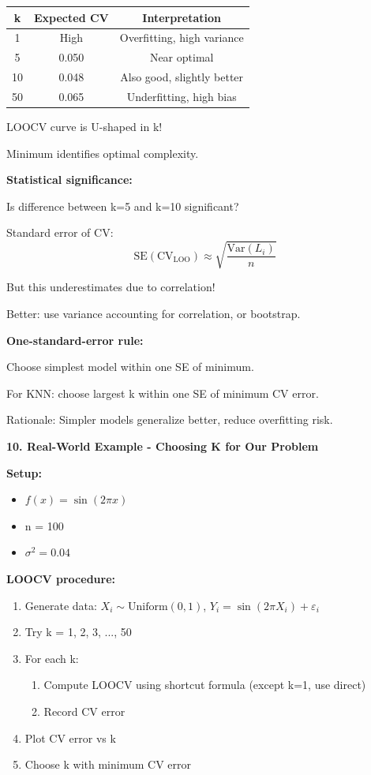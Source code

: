 \documentclass[12pt]{article}
\begin{document}
\begin{explanation}
\begin{center}
\begin{tabular}{c|c|c}
k & Expected CV & Interpretation \\
\hline
1 & High & Overfitting, high variance \\
5 & 0.050 & Near optimal \\
10 & 0.048 & Also good, slightly better \\
50 & 0.065 & Underfitting, high bias \\
\end{tabular}
\end{center}

LOOCV curve is U-shaped in k!

Minimum identifies optimal complexity.

\textbf{Statistical significance:}

Is difference between k=5 and k=10 significant?

Standard error of CV:
\[
\text{SE}(\text{CV}_{\text{LOO}}) \approx \sqrt{\frac{\text{Var}(L_i)}{n}}
\]

But this underestimates due to correlation!

Better: use variance accounting for correlation, or bootstrap.

\textbf{One-standard-error rule:}

Choose simplest model within one SE of minimum.

For KNN: choose largest k within one SE of minimum CV error.

Rationale: Simpler models generalize better, reduce overfitting risk.

\textbf{10. Real-World Example - Choosing K for Our Problem}

\textbf{Setup:}
\begin{itemize}
    \item $f(x) = \sin(2\pi x)$
    \item n = 100
    \item $\sigma^2 = 0.04$
\end{itemize}

\textbf{LOOCV procedure:}

\begin{enumerate}
    \item Generate data: $X_i \sim \text{Uniform}(0,1)$, $Y_i = \sin(2\pi X_i) + \varepsilon_i$
    \item Try k = 1, 2, 3, ..., 50
    \item For each k:
    \begin{enumerate}
        \item Compute LOOCV using shortcut formula (except k=1, use direct)
        \item Record CV error
    \end{enumerate}
    \item Plot CV error vs k
    \item Choose k with minimum CV error
\end{enumerate}


\end{explanation}
\end{document}
